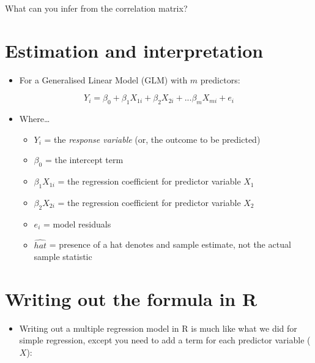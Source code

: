 \documentclass[
]{article}
\providecommand{\tightlist}{%
  \setlength{\itemsep}{0pt}\setlength{\parskip}{0pt}}
\begin{document}
What can you infer from the correlation matrix?

\hypertarget{estimation-and-interpretation}{%
\section{Estimation and
interpretation}\label{estimation-and-interpretation}}

\begin{itemize}
\tightlist
\item
  For a Generalised Linear Model (GLM) with \(m\) predictors:
\end{itemize}

\[Y_i = \beta_0 + \beta_1 X_{1i} + \beta_2 X_{2i} + ... \beta_mX_{mi} + e_i\]

\begin{itemize}
\tightlist
\item
  Where\ldots{}

  \begin{itemize}
  \tightlist
  \item
    \(Y_i\) = the \emph{response variable} (or, the outcome to be
    predicted)
  \item
    \(\beta_0\) = the intercept term
  \item
    \(\beta_1 X_{1i}\) = the regression coefficient for predictor
    variable \(X_1\)
  \item
    \(\beta_2 X_{2i}\) = the regression coefficient for predictor
    variable \(X_2\)
  \item
    \(e_i\) = model residuals
  \item
    \(\hat{hat}\) = presence of a hat denotes and sample estimate, not
    the actual sample statistic
  \end{itemize}
\end{itemize}

\hypertarget{writing-out-the-formula-in-r}{%
\section{Writing out the formula in
R}\label{writing-out-the-formula-in-r}}

\begin{itemize}
\tightlist
\item
  Writing out a multiple regression model in R is much like what we did
  for simple regression, except you need to add a term for each
  predictor variable (\(X\)):
\end{itemize}
\end{document}
